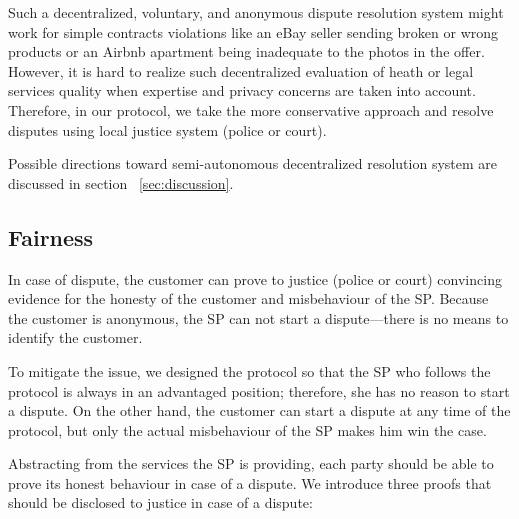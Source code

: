 \documentclass{ieeeaccess}
\begin{document}
Such a decentralized, voluntary, and anonymous dispute resolution system might work for simple contracts violations like an eBay seller sending broken or wrong products or an Airbnb apartment being inadequate to the photos in the offer. However, it is hard to realize such decentralized evaluation of heath or legal services quality when expertise and privacy concerns are taken into account. Therefore, in our protocol, we take the more conservative approach and resolve disputes using local
justice system (police or court).

Possible directions toward semi-autonomous decentralized resolution system are discussed in section ~\ref{sec:discussion}.

\subsection{Fairness}\label{fairness}

In case of dispute, the customer can prove to justice (police or court) convincing evidence for the honesty of the customer and misbehaviour of the SP. 
Because the customer is anonymous, the SP can not start a dispute---there is no means to identify the customer.

To mitigate the issue, we designed the protocol so that the SP who follows the protocol is always in an advantaged position; therefore, she has no reason to start a dispute. On the other hand, the customer can start a dispute at any time of the protocol, but only the actual misbehaviour of the SP makes him win the case.

Abstracting from the services the SP is providing, each party should be able to prove its honest behaviour in case of a dispute. We introduce three proofs that should be disclosed to justice in case of a dispute:
\end{document}
